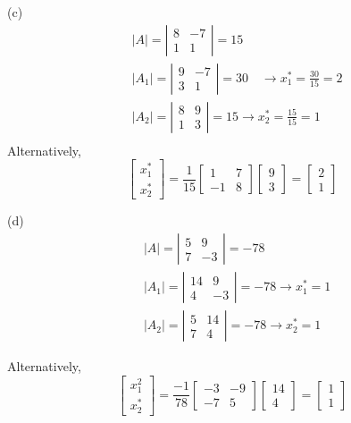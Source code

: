 \begin{enumerate}
(c)
\[
\begin{aligned}
& |A|=\left|\begin{array}{cc}
8 & -7 \\
1 & 1
\end{array}\right|=15 \\
& \left|A_{1}\right|=\left|\begin{array}{cc}
9 & -7 \\
3 & 1
\end{array}\right|=30 \quad \rightarrow x_{1}^{*}=\frac{30}{15}=2 \\
& \left|A_{2}\right|=\left|\begin{array}{cc}
8 & 9 \\
1 & 3
\end{array}\right|=15 \rightarrow x_{2}^{*}=\frac{15}{15}=1 \\
\end{aligned}
\]
Alternatively, 
\[\left[\begin{array}{c}
x_{1}^{*} \\
x_{2}^{*}
\end{array}\right]=\frac{1}{15}\left[\begin{array}{cc}
1 & 7 \\
-1 & 8
\end{array}\right]\left[\begin{array}{l}
9 \\
3
\end{array}\right]=\left[\begin{array}{l}
2 \\
1
\end{array}\right]
\]

(d)
\[
\begin{aligned}
& |A|=\left|\begin{array}{cc}
5 & 9 \\
7 & -3
\end{array}\right|=-78 \\
& \left|A_{1}\right|=\left|\begin{array}{cc}
14 & 9 \\
4 & -3
\end{array}\right|=-78 \rightarrow x_{1}^{*}=1 \\
& \left|A_{2}\right|=\left|\begin{array}{cc}
5 & 14 \\
7 & 4
\end{array}\right|=-78 \rightarrow x_{2}^{*}=1
\end{aligned}
\]

Alternatively, \[\left[\begin{array}{l}x_{1}^{2} \\ x_{2}^{*}\end{array}\right]=\frac{-1}{78}\left[\begin{array}{cc}-3 & -9 \\ -7 & 5\end{array}\right]\left[\begin{array}{c}14 \\ 4\end{array}\right]=\left[\begin{array}{l}1 \\ 1\end{array}\right]\]


\end{enumerate}
